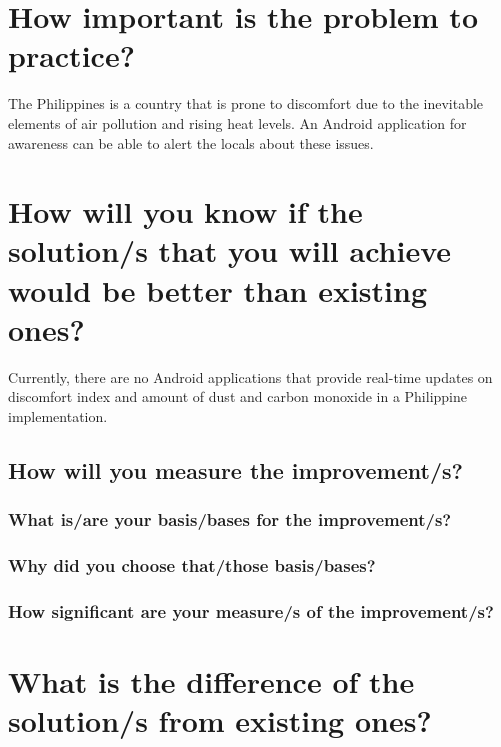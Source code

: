 


\section{How important is the problem to practice?}

The Philippines is a country that is prone to discomfort due to the inevitable elements of air pollution and rising heat levels. An Android application for awareness can be able to alert the locals about these issues.	
	
\section{How will you know if the solution/s that you will achieve would be better than existing ones?}	

Currently, there are no Android applications that provide real-time updates on discomfort index and amount of dust and carbon monoxide in a Philippine implementation.

\subsection{How will you measure the improvement/s?}	

\blindtext
	
\subsubsection{What is/are your basis/bases for the improvement/s?}

\blindtext
		
\subsubsection{Why did you choose that/those basis/bases?}

\blindtext
				
\subsubsection{How significant are your measure/s of the improvement/s?}

\blindtext






	
\section{What is the difference of the solution/s from existing ones?}
	
